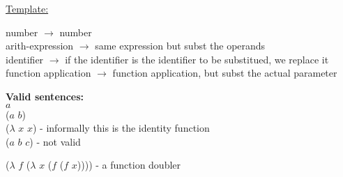 \documentclass{article}
\begin{document}
\begin{flushleft}
\begin{flushleft}
\underline{Template:}\\
\end{flushleft}
\begin{flushleft}
number $\rightarrow$ number\\
arith-expression $\rightarrow$ same expression but subst the operands\\
identifier $\rightarrow$ if the identifier is the identifier to be substitued, we replace it\\
function application $\rightarrow$ function application, but subst the actual parameter\\
\end{flushleft}
\textbf{Valid sentences:}\\
$\mathit{a}$\\
($\mathit{a}$ $\mathit{b}$)\\
($\lambda$ $\mathit{x}$ $\mathit{x}$) - informally this is the identity function\\
{($\mathit{a}$ $\mathit{b}$ $\mathit{c}$)} - {not valid}

($\lambda$ $\mathit{f}$ ($\lambda$ $\mathit{x}$ ($\mathit{f}$ 
($\mathit{f}$ $\mathit{x}$)))) - a function doubler\\
\end{flushleft}
\end{document}
